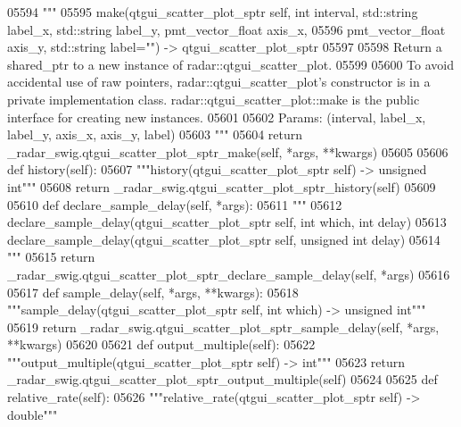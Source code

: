 \begin{DoxyCode}
{{{{{{{{{{{{{{{{{{{05594         \textcolor{stringliteral}{"""}
05595 \textcolor{stringliteral}{        make(qtgui\_scatter\_plot\_sptr self, int interval, std::string label\_x, std::string label\_y,
       pmt\_vector\_float axis\_x, }
05596 \textcolor{stringliteral}{            pmt\_vector\_float axis\_y, std::string label="") -> qtgui\_scatter\_plot\_sptr}
05597 \textcolor{stringliteral}{}
05598 \textcolor{stringliteral}{        Return a shared\_ptr to a new instance of radar::qtgui\_scatter\_plot.}
05599 \textcolor{stringliteral}{}
05600 \textcolor{stringliteral}{        To avoid accidental use of raw pointers, radar::qtgui\_scatter\_plot's constructor is in a private
       implementation class. radar::qtgui\_scatter\_plot::make is the public interface for creating new instances.}
05601 \textcolor{stringliteral}{}
05602 \textcolor{stringliteral}{        Params: (interval, label\_x, label\_y, axis\_x, axis\_y, label)}
05603 \textcolor{stringliteral}{        """}
05604         \textcolor{keywordflow}{return} \_radar\_swig.qtgui\_scatter\_plot\_sptr\_make(self, *args, **kwargs)
05605 
05606     \textcolor{keyword}{def }history(self):
05607         \textcolor{stringliteral}{"""history(qtgui\_scatter\_plot\_sptr self) -> unsigned int"""}
05608         \textcolor{keywordflow}{return} \_radar\_swig.qtgui\_scatter\_plot\_sptr\_history(self)
05609 
05610     \textcolor{keyword}{def }declare_sample_delay(self, *args):
05611         \textcolor{stringliteral}{"""}
05612 \textcolor{stringliteral}{        declare\_sample\_delay(qtgui\_scatter\_plot\_sptr self, int which, int delay)}
05613 \textcolor{stringliteral}{        declare\_sample\_delay(qtgui\_scatter\_plot\_sptr self, unsigned int delay)}
05614 \textcolor{stringliteral}{        """}
05615         \textcolor{keywordflow}{return} \_radar\_swig.qtgui\_scatter\_plot\_sptr\_declare\_sample\_delay(self, *args)
05616 
05617     \textcolor{keyword}{def }sample_delay(self, *args, **kwargs):
05618         \textcolor{stringliteral}{"""sample\_delay(qtgui\_scatter\_plot\_sptr self, int which) -> unsigned int"""}
05619         \textcolor{keywordflow}{return} \_radar\_swig.qtgui\_scatter\_plot\_sptr\_sample\_delay(self, *args, **kwargs)
05620 
05621     \textcolor{keyword}{def }output_multiple(self):
05622         \textcolor{stringliteral}{"""output\_multiple(qtgui\_scatter\_plot\_sptr self) -> int"""}
05623         \textcolor{keywordflow}{return} \_radar\_swig.qtgui\_scatter\_plot\_sptr\_output\_multiple(self)
05624 
05625     \textcolor{keyword}{def }relative_rate(self):
05626         \textcolor{stringliteral}{"""relative\_rate(qtgui\_scatter\_plot\_sptr self) -> double"""}
}}}}}}}}}}}}}}}}}}}
\end{DoxyCode}
